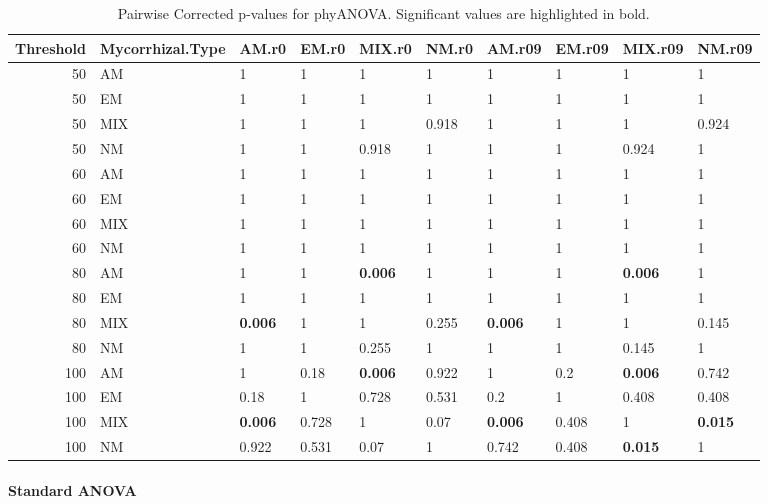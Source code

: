 \documentclass[]{article}
\let\oldparagraph\paragraph
\renewcommand{\paragraph}[1]{\oldparagraph{#1}\mbox{}}
\begin{document}
\begin{table}[H]

\caption{\label{tab:unnamed-chunk-14}Pairwise Corrected p-values for phyANOVA. Significant values are highlighted in bold.}
\centering
\begin{tabular}{r|l|l|l|l|l|l|l|l|l}
\hline
Threshold & Mycorrhizal.Type & AM.r0 & EM.r0 & MIX.r0 & NM.r0 & AM.r09 & EM.r09 & MIX.r09 & NM.r09\\
\hline
50 & AM & 1 & 1 & 1 & 1 & 1 & 1 & 1 & 1\\
\hline
50 & EM & 1 & 1 & 1 & 1 & 1 & 1 & 1 & 1\\
\hline
50 & MIX & 1 & 1 & 1 & 0.918 & 1 & 1 & 1 & 0.924\\
\hline
50 & NM & 1 & 1 & 0.918 & 1 & 1 & 1 & 0.924 & 1\\
\hline
60 & AM & 1 & 1 & 1 & 1 & 1 & 1 & 1 & 1\\
\hline
60 & EM & 1 & 1 & 1 & 1 & 1 & 1 & 1 & 1\\
\hline
60 & MIX & 1 & 1 & 1 & 1 & 1 & 1 & 1 & 1\\
\hline
60 & NM & 1 & 1 & 1 & 1 & 1 & 1 & 1 & 1\\
\hline
80 & AM & 1 & 1 & \textbf{0.006} & 1 & 1 & 1 & \textbf{0.006} & 1\\
\hline
80 & EM & 1 & 1 & 1 & 1 & 1 & 1 & 1 & 1\\
\hline
80 & MIX & \textbf{0.006} & 1 & 1 & 0.255 & \textbf{0.006} & 1 & 1 & 0.145\\
\hline
80 & NM & 1 & 1 & 0.255 & 1 & 1 & 1 & 0.145 & 1\\
\hline
100 & AM & 1 & 0.18 & \textbf{0.006} & 0.922 & 1 & 0.2 & \textbf{0.006} & 0.742\\
\hline
100 & EM & 0.18 & 1 & 0.728 & 0.531 & 0.2 & 1 & 0.408 & 0.408\\
\hline
100 & MIX & \textbf{0.006} & 0.728 & 1 & 0.07 & \textbf{0.006} & 0.408 & 1 & \textbf{0.015}\\
\hline
100 & NM & 0.922 & 0.531 & 0.07 & 1 & 0.742 & 0.408 & \textbf{0.015} & 1\\
\hline
\end{tabular}
\end{table}

\hypertarget{standard-anova-3}{%
\paragraph{Standard ANOVA}\label{standard-anova-3}}
\end{document}

